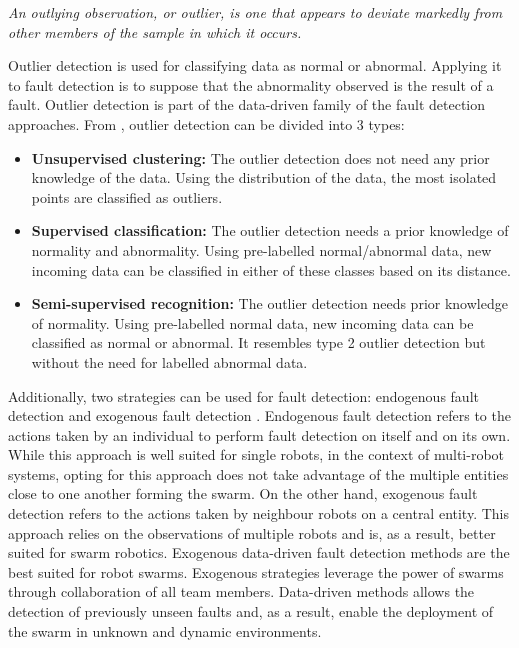 \begin{center}
\textit{An outlying observation, or outlier, is one that appears to deviate
markedly from other members of the sample in which it occurs.}
\end{center} 

Outlier detection is used for classifying data as normal or abnormal. Applying it to fault detection is to suppose that the abnormality observed is the result of a fault. Outlier detection is part of the data-driven family of the fault detection approaches. From \cite{hodge2004survey}, outlier detection can be divided into 3 types: 

\begin{itemize}
    \item \textbf{Unsupervised clustering:} The outlier detection does not need any prior knowledge of the data. Using the distribution of the data, the most isolated points are classified as outliers.
    \item \textbf{Supervised classification:} The outlier detection needs a prior knowledge of normality and abnormality. Using pre-labelled normal/abnormal data, new incoming data can be classified in either of these classes based on its distance. 
    \item \textbf{Semi-supervised recognition:} The outlier detection needs prior knowledge of normality. Using pre-labelled normal data, new incoming data can be classified as normal or abnormal. It resembles type 2 outlier detection but without the need for labelled abnormal data.
\end{itemize}


Additionally, two strategies can be used for fault detection: endogenous fault detection and exogenous fault detection \cite{christensen2008fault, lau2012error, Miller2021modern}. Endogenous fault detection refers to the actions taken by an individual to perform fault detection on itself and on its own. While this approach is well suited for single robots, in the context of multi-robot systems, opting for this approach does not take advantage of the multiple entities close to one another forming the swarm. On the other hand, exogenous fault detection refers to the actions taken by neighbour robots on a central entity. This approach relies on the observations of multiple robots and is, as a result, better suited for swarm robotics. Exogenous data-driven fault detection methods are the best suited for robot swarms. Exogenous strategies leverage the power of swarms through collaboration of all team members. Data-driven methods allows the detection of previously unseen faults and, as a result, enable the deployment of the swarm in unknown and dynamic environments.


